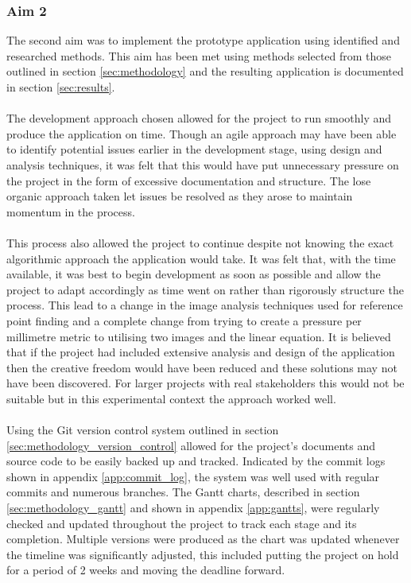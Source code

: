 		\subsubsection{Aim 2}
			The second aim was to implement the prototype application using identified and researched methods. This aim has been met using methods selected from those outlined in section \ref{sec:methodology} and the resulting application is documented in section \ref{sec:results}.
			\\\\
			The development approach chosen allowed for the project to run smoothly and produce the application on time. Though an agile approach may have been able to identify potential issues earlier in the development stage, using design and analysis techniques, it was felt that this would have put unnecessary pressure on the project in the form of excessive documentation and structure. The lose organic approach taken let issues be resolved as they arose to maintain momentum in the process. 
			\\\\
			This process also allowed the project to continue despite not knowing the exact algorithmic approach the application would take. It was felt that, with the time available, it was best to begin development as soon as possible and allow the project to adapt accordingly as time went on rather than rigorously structure the process. This lead to a change in the image analysis techniques used for reference point finding and a complete change from trying to create a pressure per millimetre metric to utilising two images and the linear equation. It is believed that if the project had included extensive analysis and design of the application then the creative freedom would have been reduced and these solutions may not have been discovered. For larger projects with real stakeholders this would not be suitable but in this experimental context the approach worked well.
			\\\\
			Using the Git version control system outlined in section \ref{sec:methodology_version_control} allowed for the project's documents and source code to be easily backed up and tracked. Indicated by the commit logs shown in appendix \ref{app:commit_log}, the system was well used with regular commits and numerous branches. The Gantt charts, described in section \ref{sec:methodology_gantt} and shown in appendix \ref{app:gantts}, were regularly checked and updated throughout the project to track each stage and its completion. Multiple versions were produced as the chart was updated whenever the timeline was significantly adjusted, this included putting the project on hold for a period of 2 weeks and moving the deadline forward.
